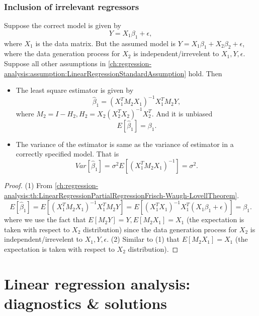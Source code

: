 \begin{refsection}
\begin{example}
	
\end{example}


\subsubsection{Inclusion of irrelevant regressors}

\begin{lemma}
	Suppose the correct model is given by
	$$Y = X_1\beta_1 + \epsilon,$$
	where $X_1$ is the data matrix.
	But the assumed model is $Y = X_1\beta_1 + X_2\beta_2 + \epsilon$, where the data generation process for $X_2$ is independent/irrevelent to $X_1, Y, \epsilon$. 
	Suppose all other assumptions in \autoref{ch:regression-analysis:assumption:LinearRegressionStandardAssumption} hold.
	Then
	\begin{itemize}
		\item The least square estimator is given by $$\hat{\beta}_1 = (X_1^TM_2X_1)^{-1}X_1^TM_2Y,$$
		where $M_2 = I - H_2, H_2 = X_2(X_2^TX_2)^{-1}X_2^T$. And it is unbiased
		$$E[\hat{\beta}_1] = \beta_1.$$
		\item The variance of the estimator is same as the variance of estimator in a correctly specified model. That is
		$$Var[\hat{\beta}_1] = \sigma^2 E[(X_1^TM_2X_1)^{-1}] = \sigma^2. $$		
	\end{itemize}	
\end{lemma}
\begin{proof}
	(1) From \autoref{ch:regression-analysis:th:LinearRegressionPartialRegressionFrisch-Waugh-LovellTheorem}.
	$$E[\hat{\beta}_1] = E[(X_1^TM_2X_1)^{-1}X_1^TM_2Y] = E[(X_1^TX_1)^{-1}X_1^T(X_1\beta_1 + \epsilon)] = \beta_1.$$
	where we use the fact that $E[M_2Y] = Y, E[M_2X_1] = X_1$ (the expectation is taken with respect to $X_2$ distribution) since the data generation process for $X_2$ is independent/irrevelent to $X_1, Y, \epsilon$. 
	(2) Similar to (1) that $E[M_2X_1] = X_1$ (the expectation is taken with respect to $X_2$ distribution).
\end{proof}


\section{Linear regression analysis: diagnostics \& solutions}




\end{refsection}
